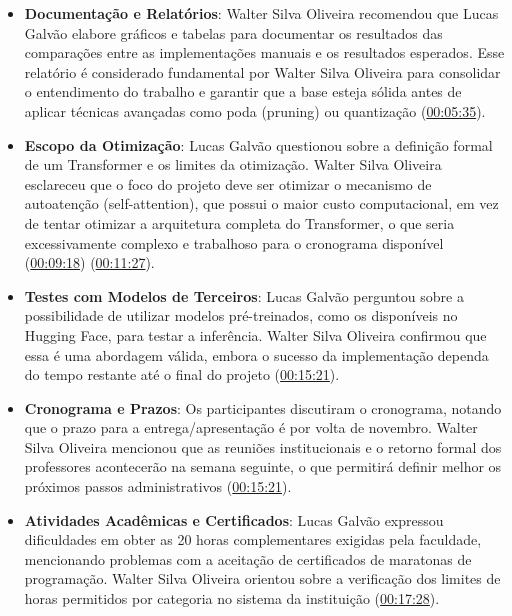 \begin{itemize}
\item \textbf{Documentação e Relatórios}: Walter Silva Oliveira recomendou que Lucas Galvão elabore gráficos e tabelas para documentar os resultados das comparações entre as implementações manuais e os resultados esperados. Esse relatório é considerado fundamental por Walter Silva Oliveira para consolidar o entendimento do trabalho e garantir que a base esteja sólida antes de aplicar técnicas avançadas como poda (pruning) ou quantização (\href{\#00:05:35}{00:05:35}).
\end{itemize}

\begin{itemize}
\item \textbf{Escopo da Otimização}: Lucas Galvão questionou sobre a definição formal de um Transformer e os limites da otimização. Walter Silva Oliveira esclareceu que o foco do projeto deve ser otimizar o mecanismo de autoatenção (self-attention), que possui o maior custo computacional, em vez de tentar otimizar a arquitetura completa do Transformer, o que seria excessivamente complexo e trabalhoso para o cronograma disponível (\href{\#00:09:18}{00:09:18}) (\href{\#00:11:27}{00:11:27}).
\end{itemize}

\begin{itemize}
\item \textbf{Testes com Modelos de Terceiros}: Lucas Galvão perguntou sobre a possibilidade de utilizar modelos pré-treinados, como os disponíveis no Hugging Face, para testar a inferência. Walter Silva Oliveira confirmou que essa é uma abordagem válida, embora o sucesso da implementação dependa do tempo restante até o final do projeto (\href{\#00:15:21}{00:15:21}).
\end{itemize}

\begin{itemize}
\item \textbf{Cronograma e Prazos}: Os participantes discutiram o cronograma, notando que o prazo para a entrega/apresentação é por volta de novembro. Walter Silva Oliveira mencionou que as reuniões institucionais e o retorno formal dos professores acontecerão na semana seguinte, o que permitirá definir melhor os próximos passos administrativos (\href{\#00:15:21}{00:15:21}).
\end{itemize}

\begin{itemize}
\item \textbf{Atividades Acadêmicas e Certificados}: Lucas Galvão expressou dificuldades em obter as 20 horas complementares exigidas pela faculdade, mencionando problemas com a aceitação de certificados de maratonas de programação. Walter Silva Oliveira orientou sobre a verificação dos limites de horas permitidos por categoria no sistema da instituição (\href{\#00:17:28}{00:17:28}).
\end{itemize}

